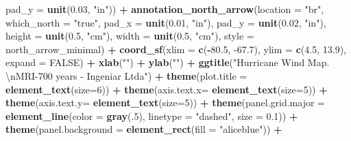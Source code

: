 \documentclass[12pt,oneside]{reedthesis}
\newenvironment{Shaded}{\begin{snugshade}}{\end{snugshade}}
\newcommand{\CharTok}[1]{\textcolor[rgb]{0.31,0.60,0.02}{#1}}
\newcommand{\DataTypeTok}[1]{\textcolor[rgb]{0.13,0.29,0.53}{#1}}
\newcommand{\DecValTok}[1]{\textcolor[rgb]{0.00,0.00,0.81}{#1}}
\newcommand{\FloatTok}[1]{\textcolor[rgb]{0.00,0.00,0.81}{#1}}
\newcommand{\KeywordTok}[1]{\textcolor[rgb]{0.13,0.29,0.53}{\textbf{#1}}}
\newcommand{\NormalTok}[1]{#1}
\newcommand{\OperatorTok}[1]{\textcolor[rgb]{0.81,0.36,0.00}{\textbf{#1}}}
\newcommand{\OtherTok}[1]{\textcolor[rgb]{0.56,0.35,0.01}{#1}}
\newcommand{\StringTok}[1]{\textcolor[rgb]{0.31,0.60,0.02}{#1}}
\begin{document}
\begin{Shaded}
\begin{Highlighting}[]
   \DataTypeTok{pad_y =} \KeywordTok{unit}\NormalTok{(}\FloatTok{0.03}\NormalTok{, }\StringTok{"in"}\NormalTok{)) }\OperatorTok{+}\StringTok{ }
\StringTok{  }\KeywordTok{annotation_north_arrow}\NormalTok{(}\DataTypeTok{location =} \StringTok{"br"}\NormalTok{, }\DataTypeTok{which_north =} \StringTok{"true"}\NormalTok{, }\DataTypeTok{pad_x =} \KeywordTok{unit}\NormalTok{(}\FloatTok{0.01}\NormalTok{, }\StringTok{"in"}\NormalTok{), }\DataTypeTok{pad_y =} \KeywordTok{unit}\NormalTok{(}\FloatTok{0.02}\NormalTok{, }\StringTok{"in"}\NormalTok{), }\DataTypeTok{height =} \KeywordTok{unit}\NormalTok{(}\FloatTok{0.5}\NormalTok{, }\StringTok{"cm"}\NormalTok{), }
   \DataTypeTok{width =} \KeywordTok{unit}\NormalTok{(}\FloatTok{0.5}\NormalTok{, }\StringTok{"cm"}\NormalTok{), }\DataTypeTok{style =}\NormalTok{ north_arrow_minimal) }\OperatorTok{+}
\StringTok{  }\KeywordTok{coord_sf}\NormalTok{(}\DataTypeTok{xlim =} \KeywordTok{c}\NormalTok{(}\OperatorTok{-}\FloatTok{80.5}\NormalTok{, }\FloatTok{-67.7}\NormalTok{), }\DataTypeTok{ylim =} \KeywordTok{c}\NormalTok{(}\FloatTok{4.5}\NormalTok{, }\FloatTok{13.9}\NormalTok{), }\DataTypeTok{expand =} \OtherTok{FALSE}\NormalTok{) }\OperatorTok{+}
\StringTok{  }\KeywordTok{xlab}\NormalTok{(}\StringTok{""}\NormalTok{) }\OperatorTok{+}\StringTok{ }
\StringTok{  }\KeywordTok{ylab}\NormalTok{(}\StringTok{""}\NormalTok{) }\OperatorTok{+}\StringTok{ }
\StringTok{  }\KeywordTok{ggtitle}\NormalTok{(}\StringTok{"Hurricane Wind Map. }\CharTok{\textbackslash{}n}\StringTok{MRI-700 years - Ingeniar Ltda"}\NormalTok{) }\OperatorTok{+}\StringTok{ }
\StringTok{  }\KeywordTok{theme}\NormalTok{(}\DataTypeTok{plot.title =} \KeywordTok{element_text}\NormalTok{(}\DataTypeTok{size=}\DecValTok{6}\NormalTok{)) }\OperatorTok{+}
\StringTok{  }\KeywordTok{theme}\NormalTok{(}\DataTypeTok{axis.text.x=} \KeywordTok{element_text}\NormalTok{(}\DataTypeTok{size=}\DecValTok{5}\NormalTok{)) }\OperatorTok{+}\StringTok{ }
\StringTok{  }\KeywordTok{theme}\NormalTok{(}\DataTypeTok{axis.text.y=} \KeywordTok{element_text}\NormalTok{(}\DataTypeTok{size=}\DecValTok{5}\NormalTok{)) }\OperatorTok{+}
\StringTok{  }\KeywordTok{theme}\NormalTok{(}\DataTypeTok{panel.grid.major =} \KeywordTok{element_line}\NormalTok{(}\DataTypeTok{color =} \KeywordTok{gray}\NormalTok{(.}\DecValTok{5}\NormalTok{), }\DataTypeTok{linetype =} \StringTok{"dashed"}\NormalTok{, }\DataTypeTok{size =} \FloatTok{0.1}\NormalTok{)) }\OperatorTok{+}
\StringTok{  }\KeywordTok{theme}\NormalTok{(}\DataTypeTok{panel.background =} \KeywordTok{element_rect}\NormalTok{(}\DataTypeTok{fill =} \StringTok{"aliceblue"}\NormalTok{)) }\OperatorTok{+}

\end{Highlighting}
\end{Shaded}
\end{document}
